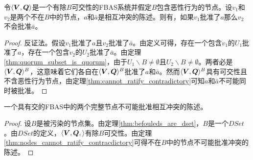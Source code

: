 \begin{theorem}\label{thm:nodes_cannot_ratify_contracdictory}
        令$\langle{\bm V},{\bm Q}\rangle$是一个有除$B${\quorum}可交性的FBAS系统并假定$B$包含恶性行为的节点。设$v_1$和$v_2$是两个不在$B$中的节点，$a$和$\bar a$是相互冲突的陈述。则有，如果$v_1$批准了$a$那么$v_2$不会批准$\bar a$。
\end{theorem}

\begin{proof}
        反证法。假设$v_1$批准了$a$且$v_2$批准了$\bar a$。由定义可得，存在一个包含$v_1$的{\quorum}$U_1$批准了$a$，存在一个包含$v_2$的{\quorum}$U_2$批准了$\bar a$。由定理\ref{thm:quorum_subset_is_quorum}，由于$U_1\backslash B\neq \emptyset$且$U_2\backslash B\neq \emptyset$。两者必是$\langle{\bm V},{\bm Q}\rangle^{B}$，这意味着它们各自在$\langle{\bm V},{\bm Q}\rangle^{B}$批准了$a$和$\bar a$。然而$\langle{\bm V},{\bm Q}\rangle^{B}$具有{\quorum}可交性且不含恶性行为节点，由定理\ref{thm:cannot_ratify_contradictory}可知$a$和$\bar a$不可能同时被批准。
\end{proof}

\begin{theorem}\label{thm:intact_cannot_ratify_contracdictory}
        一个具有{\quorum}交的FBAS中的两个完整节点不可能批准相互冲突的陈述。
\end{theorem}

\begin{proof}
        设$B$是被污染的节点集。由定理\ref{thm:befouleds_are_dset}，$B$是一个$DSet$。由$DSet$的定义，$\langle{\bm V},{\bm Q},\rangle$有除$B${\quorum}可交性。由定理\ref{thm:nodes_cannot_ratify_contracdictory}可得不在$B$中的节点不可能批准冲突的陈述。
\end{proof}